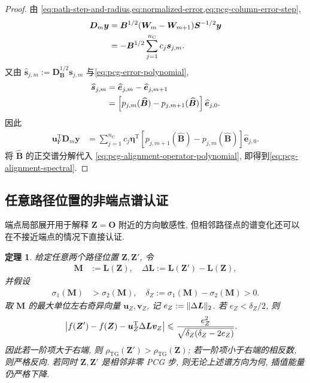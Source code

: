\documentclass{ctexart}
\newcommand{\q}{\quad}
\newcommand{\T}{\mathrm{T}}
\newcommand{\dt}{\delta}
\renewcommand{\le}{\leqslant}
\DeclarePairedDelimiter\norm{\lVert}{\rVert}
\DeclarePairedDelimiter\abs{\lvert}{\rvert}
\newtheorem{theorem}{定理}[section]
\begin{document}
\begin{proof}
由
\cref{eq:path-step-and-radius,eq:normalized-error,eq:pcg-column-error-step},
\begin{align}
    \bm D_m\bm y
    &=
    \bm B^{1/2}
    (\bm W_m-\bm W_{m+1})
    \bm S^{-1/2}\bm y\notag\\
    &=
    -\bm B^{1/2}
    \sum_{j=1}^{n_{\mathrm C}}c_j\bm s_{j,m}.
    \label{eq:pcg-Dm-column-sum}
\end{align}
又由
$\widehat{\bm s}_{j,m}:=\bm D_{\bm B}^{1/2}\bm s_{j,m}$
与\cref{eq:pcg-error-polynomial},
\begin{align}
    \widehat{\bm s}_{j,m}
    &=
    \widehat{\bm e}_{j,m}
    -\widehat{\bm e}_{j,m+1}\notag\\
    &=
    \left[
      p_{j,m}(\widehat{\bm B})
      -p_{j,m+1}(\widehat{\bm B})
    \right]
    \widehat{\bm e}_{j,0}.
    \label{eq:pcg-step-polynomial}
\end{align}
因此
\begin{align}
    \bm u_{\mathrm F}^\T\bm D_m\bm y
    &=
    \sum_{j=1}^{n_{\mathrm C}}c_j
    \bm\eta^\T
    \left[
      p_{j,m+1}(\widehat{\bm B})
      -p_{j,m}(\widehat{\bm B})
    \right]
    \widehat{\bm e}_{j,0}.
    \label{eq:pcg-alignment-operator-polynomial}
\end{align}
将 $\widehat{\bm B}$ 的正交谱分解代入
\cref{eq:pcg-alignment-operator-polynomial},
即得到\cref{eq:pcg-alignment-spectral}.
\end{proof}


\subsection{任意路径位置的非端点谱认证}
\label{sec:pathwise-spectral-criterion}

端点局部展开用于解释 $\bm Z=\mathbf O$ 附近的方向敏感性, 但相邻路径点的谱变化还可以在不接近端点的情况下直接认证.

\begin{theorem}
\label{thm:pathwise-spectral-criterion}
给定任意两个路径位置 $\bm Z,\bm Z'$, 令
\begin{align}
    \bm M&:=\bm L(\bm Z),\q
    \Delta\bm L:=\bm L(\bm Z')-\bm L(\bm Z),
    \label{eq:pathwise-M-deltaL}
\end{align}
并假设
\begin{align}
    \sigma_1(\bm M)&>\sigma_2(\bm M),\q
    \dt_Z:=\sigma_1(\bm M)-\sigma_2(\bm M)>0.
    \label{eq:pathwise-gap}
\end{align}
取 $\bm M$ 的最大单位左右奇异向量 $\bm u_Z,\bm v_Z$, 记
$e_Z:=\norm{\Delta\bm L}_2$. 若 $e_Z<\dt_Z/2$, 则
\begin{align}
    \abs*{
      f(\bm Z')-f(\bm Z)
      -\bm u_Z^\T\Delta\bm L\bm v_Z}
    &\le
    \frac{e_Z^2}{\sqrt{\dt_Z(\dt_Z-2e_Z)}}.
    \label{eq:pathwise-spectral-remainder}
\end{align}
因此若一阶项大于右端, 则
$\rho_{\mathrm{TG}}(\bm Z')>\rho_{\mathrm{TG}}(\bm Z)$; 若一阶项小于右端的相反数, 则严格反向. 若同时 $\bm Z,\bm Z'$ 是相邻非零 PCG 步, 则无论上述谱方向为何, 插值能量仍严格下降.
\end{theorem}
\end{document}
